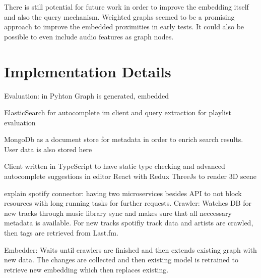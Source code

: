 \documentclass[sigconf]{acmart}
\begin{document}
There is still potential for future work in order to improve the embedding itself and also the query mechanism. Weighted graphs seemed to be a promising approach to improve the embedded proximities in early tests. It could also be possible to even include audio features as graph nodes.






\newpage
\appendix
\section{Implementation Details}


Evaluation:
in Pyhton
Graph is generated, embedded 


ElasticSearch for autocomplete im client and query extraction for playlist evaluation

MongoDb as a document store for metadata in order to enrich search results. User data is also stored here


Client
written in TypeScript to have static type checking and advanced autocomplete suggestions in editor
React with Redux 
ThreeJs to render 3D scene


explain spotify connector:
having two microservices besides API to not block resources with long running tasks for further requests. 
Crawler: Watches DB for new tracks through music library sync and makes sure that all neccessary metadata is available. For new tracks spotifiy track data and artists are crawled, then tags are retrieved from Last.fm.

Embedder: Waits until crawlers are finished and then extends existing graph with new data. The changes are collected and then existing model is retrained to retrieve new embedding which then replaces existing.
\end{document}
